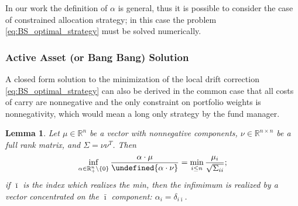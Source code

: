 \documentclass[11pt]{article}
\newtheorem{lemma}[theorem]{Lemma}
\let\norm\undefined %
\DeclarePairedDelimiter\norm{\lVert}{\rVert}
\begin{document}
In our work the definition of $\alpha$ is general, thus it is possible to consider the case of constrained allocation strategy; in this case the problem \eqref{eq:BS_optimal_strategy} must be solved numerically.
\subsubsection{Active Asset (or Bang Bang) Solution}
A closed form solution to the minimization of the local drift correction \eqref{eq:BS_optimal_strategy} can also be derived in the common case that all costs of carry are nonnegative and the only constraint on portfolio weights is nonnegativity, which would mean a long only strategy by the fund manager.

\begin{lemma}
	Let $\mu \in \mathbb{R}^n$ be a vector with nonnegative components, $\nu \in \mathbb{R}^{n\times n}$ be a full rank matrix, and $\Sigma = \nu \nu^{T}$. Then
	\begin{equation}\label{eq:inf}
		\inf_{\alpha \in \mathbb{R}_{+}^n \setminus \{0\}} \frac{\alpha \cdot \mu}{\norm{\alpha \cdot \nu}} = \min_{i\leq n} \frac{\mu_i}{\sqrt{\Sigma_{ii}}};
	\end{equation}
	if $\bar{\imath}$ is the index which realizes the min, then the infimimum is realized by a vector concentrated on the $\bar{\imath}$ component: $\alpha_i = \delta_{i\bar{\imath}}$. 
\end{lemma}
\end{document}
